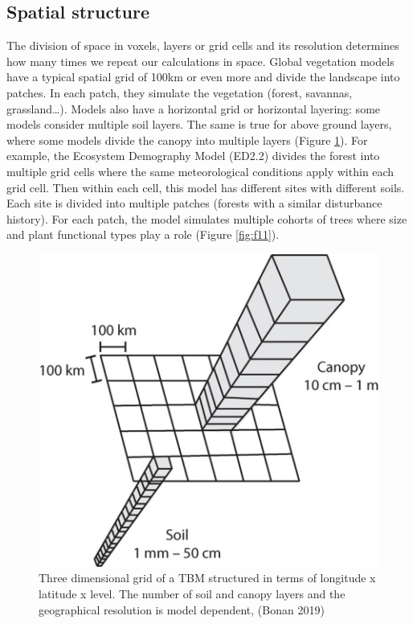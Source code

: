 \documentclass[12pt,oneside]{book}
\begin{document}
\subsection{Spatial structure}\label{spatial-structure}

The division of space in voxels, layers or grid cells and its resolution
determines how many times we repeat our calculations in space. Global
vegetation models have a typical spatial grid of 100km or even more and
divide the landscape into patches. In each patch, they simulate the
vegetation (forest, savannas, grassland\ldots{}). Models also have a
horizontal grid or horizontal layering: some models consider multiple
soil layers. The same is true for above ground layers, where some models
divide the canopy into multiple layers (Figure \ref{fig:f10}). For
example, the Ecosystem Demography Model (ED2.2) divides the forest into
multiple grid cells where the same meteorological conditions apply
within each grid cell. Then within each cell, this model has different
sites with different soils. Each site is divided into multiple patches
(forests with a similar disturbance history). For each patch, the model
simulates multiple cohorts of trees where size and plant functional
types play a role (Figure \ref{fig:f11}).

\begin{figure}

{\centering \includegraphics[width=0.5\linewidth]{figures/chap1/grid_vert_hor} 

}

\caption{Three dimensional grid of a TBM structured in terms of longitude x latitude x level. The number of soil and canopy layers and the geographical resolution is model dependent, (Bonan 2019)}\label{fig:f10}
\end{figure}
\end{document}
